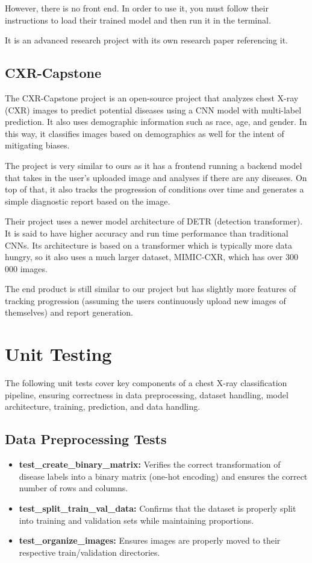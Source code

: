\documentclass[12pt, titlepage]{article}
\begin{document}
However, there is no front end. In order to use it, you must follow their instructions to load their trained model and then run it in the terminal.

It is an advanced research project with its own research paper referencing it.

\subsection{CXR-Capstone}
The CXR-Capstone project is an open-source project that analyzes chest X-ray (CXR) images to predict potential diseases using a CNN model with multi-label prediction. It also uses demographic information such as race, age, and gender. In this way, it classifies images based on demographics as well for the intent of mitigating biases.

The project is very similar to ours as it has a frontend running a backend model that takes in the user's uploaded image and analyses if there are any diseases. On top of that, it also tracks the progression of conditions over time and generates a simple diagnostic report based on the image.

Their project uses a newer model architecture of DETR (detection transformer). It is said to have higher accuracy and run time performance than traditional CNNs. Its architecture is based on a transformer which is typically more data hungry, so it also uses a much larger dataset, MIMIC-CXR, which has over 300 000 images.

The end product is still similar to our project but has slightly more features of tracking progression (assuming the users continuously upload new images of themselves) and report generation.


\section{Unit Testing}
The following unit tests cover key components of a chest X-ray classification pipeline, ensuring correctness in data preprocessing, dataset handling, model architecture, training, prediction, and data handling.

\subsection{Data Preprocessing Tests}
\begin{itemize}
    \item \textbf{test\_create\_binary\_matrix:} Verifies the correct transformation of disease labels into a binary matrix (one-hot encoding) and ensures the correct number of rows and columns.
    \item \textbf{test\_split\_train\_val\_data:} Confirms that the dataset is properly split into training and validation sets while maintaining proportions.
    \item \textbf{test\_organize\_images:} Ensures images are properly moved to their respective train/validation directories.
\end{itemize}
\end{document}
